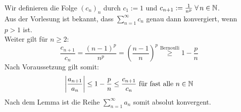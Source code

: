 \documentclass[../ana1u.tex]{subfiles}
\begin{document}
\begin{bew}
    Wir definieren die Folge \((c_n)_n \) durch \(c_1 := 1 \) und 
    \(c_{n+1} := \frac{1}{n^p} \; \forall \, n \in \mathbb{N} \). \\
    Aus der Vorlesung ist bekannt, dass \(\sum_{n=1}^{\infty} c_n \) genau dann konvergiert, 
    wenn \(p > 1 \) ist. \\
    Weiter gilt für \(n \geq 2 \):
    \[\frac{c_{n+1}}{c_n} = \frac{(n-1)^p}{n^p} 
    = \left(\frac{n-1}{n}\right)^p \overset{\text{Bernoulli}}{\geq} 1 - \frac{p}{n} \]
    Nach Voraussetzung gilt somit:
    \[\left|\frac{a_{n+1}}{a_n}\right| \leq 1 - \frac{p}{n} 
    \leq \frac{c_{n+1}}{c_n} \text{ für fast alle } n \in \mathbb{N} \]
    Nach dem Lemma ist die Reihe \(\sum_{n=1}^{\infty} a_n \) somit absolut konvergent.
\end{bew}
\end{document}
